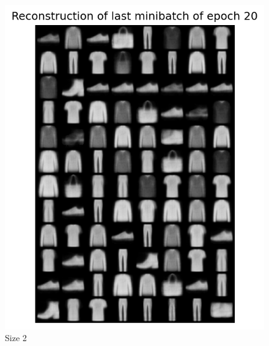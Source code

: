 \begin{enumerate}
 \begin{figure}[H]
   \centering
     \includegraphics[scale=0.6]
     {templates/re20_2}
     \caption{Size 2}
 \end{figure}


\end{enumerate}
